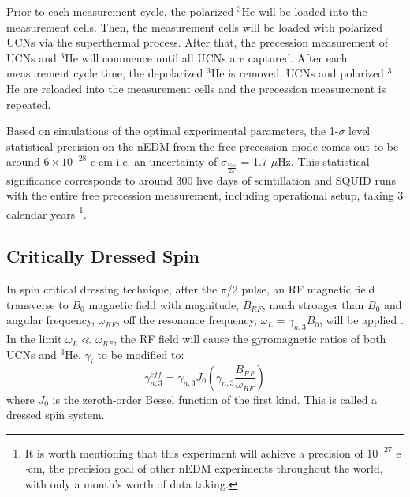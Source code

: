 Prior to each measurement cycle, the polarized $^3$He will be loaded into the measurement cells. Then, the measurement cells will be loaded with polarized UCNs via the superthermal process. After that, the precession measurement of UCNs and $^3$He will commence until all UCNs are captured. After each measurement cycle time, the depolarized $^3$He is removed, UCNs and polarized $^3$He are reloaded into the measurement cells and the precession measurement is repeated. 

Based on simulations of the optimal experimental parameters, the 1-$\sigma$ level statistical precision on the nEDM from the free precession mode comes out to be around $6 \times 10^{-28}$ e$\cdot$cm i.e. an uncertainty of $\sigma_{\frac{\omega_{n3}}{2\pi}}$ = 1.7 $\mu$Hz. This statistical significance corresponds to around 300 live days of scintillation and SQUID runs with the entire free precession measurement, including operational setup, taking 3 calendar years \footnote{It is worth mentioning that this experiment will achieve a precision of $10^{-27}$ e$\cdot$cm, the precision goal of other nEDM experiments throughout the world, with only a month's worth of data taking.}. 

\subsection{Critically Dressed Spin}

In spin critical dressing technique, after the $\pi$/2 pulse, an RF magnetic field transverse to $B_0$ magnetic field with magnitude, $B_{RF}$, much stronger than $B_0$ and angular frequency, $\omega_{RF}$, off the resonance frequency, $\omega_{L} = \gamma_{n,3} B_0 $, will be applied \cite{Haroche1970, Cohen-Tannoudji1969}. In the limit $\omega_{L} \ll \omega_{RF}$, the RF field will cause the gyromagnetic ratios of both UCNs and $^3$He, $\gamma_{i}$ to be modified to:
\begin{equation}
    \gamma_{n,3}^{eff} = \gamma_{n,3}J_0\left( \gamma_{n,3}\frac{B_{RF}}{\omega_{RF}}\right)
\end{equation}
where $J_0$ is the zeroth-order Bessel function of the first kind. This is called a dressed spin system.

